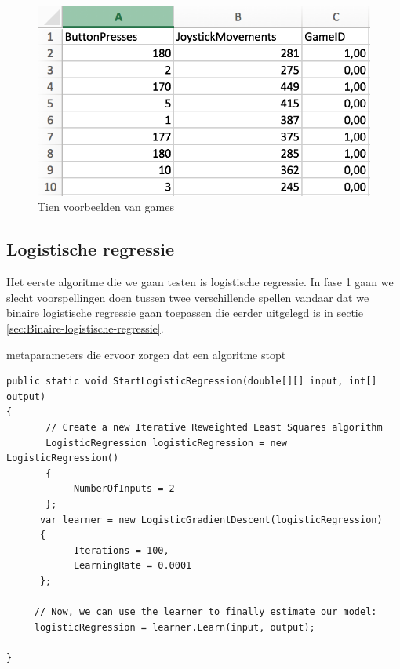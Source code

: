 \begin{figure}[]
	\centering
	\includegraphics{img/Dataset}
	\caption{Tien voorbeelden van games}
	\label{fig:regressieFig}
\end{figure}


\newpage

\subsection{Logistische regressie}
\label{sec:Logistischeregressie-fase1}

Het eerste algoritme die we gaan testen is logistische regressie. In fase 1 gaan we slecht voorspellingen doen tussen twee verschillende spellen vandaar dat we binaire logistische regressie gaan toepassen die eerder uitgelegd is in sectie \ref{sec:Binaire-logistische-regressie}.

metaparameters die ervoor zorgen dat een algoritme stopt




\begin{lstlisting}
public static void StartLogisticRegression(double[][] input, int[] output)
{
       // Create a new Iterative Reweighted Least Squares algorithm
       LogisticRegression logisticRegression = new LogisticRegression()
       {
       		NumberOfInputs = 2
       };
      var learner = new LogisticGradientDescent(logisticRegression)
      {
      		Iterations = 100,
      		LearningRate = 0.0001
      };
            
     // Now, we can use the learner to finally estimate our model:
     logisticRegression = learner.Learn(input, output);

}

\end{lstlisting}
